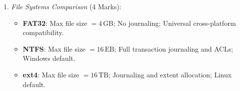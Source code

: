 \begin{solutionbox}
\begin{enumerate}[start=8]
\begin{enumerate}[label=(\alph*)]
        \item \textit{File Systems Comparison} (4 Marks):
        \begin{itemize}
            \item \textbf{FAT32}: Max file size $= 4\,\text{GB}$; No journaling; Universal cross-platform compatibility.
            \item \textbf{NTFS}: Max file size $= 16\,\text{EB}$; Full transaction journaling and ACLs; Windows default.
            \item \textbf{ext4}: Max file size $= 16\,\text{TB}$; Journaling and extent allocation; Linux default.
        \end{itemize}
    \end{enumerate}
\end{enumerate}
\end{solutionbox}
